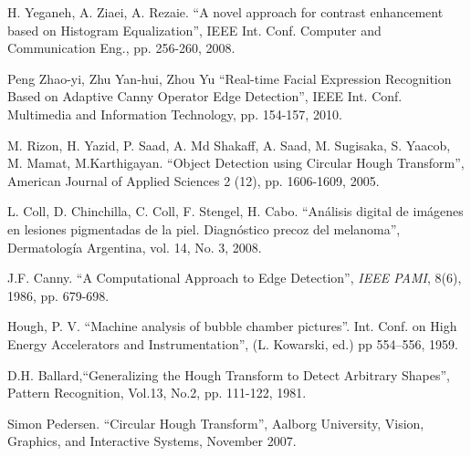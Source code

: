\documentclass[oribibl]{llncs}
\begin{document}


\begin{thebibliography}{20}

H. Yeganeh, A. Ziaei, A. Rezaie.
``A novel approach for contrast enhancement based on Histogram Equalization'',
IEEE Int. Conf. Computer and Communication Eng., pp. 256-260, 2008. 

Peng Zhao-yi, Zhu Yan-hui, Zhou Yu
``Real-time Facial Expression Recognition Based on Adaptive Canny Operator Edge Detection'',
IEEE Int. Conf. Multimedia and Information Technology, pp. 154-157, 2010. 

 M. Rizon, H. Yazid, P. Saad, A. Md Shakaff, A. Saad, M. Sugisaka, S. Yaacob, M. Mamat, M.Karthigayan.
``Object Detection using Circular Hough Transform'',
American Journal of Applied Sciences 2 (12), pp. 1606-1609, 2005.

  L. Coll, D. Chinchilla, C. Coll, F. Stengel, H. Cabo.
 ``Análisis digital de imágenes en lesiones pigmentadas de la piel. Diagnóstico precoz del melanoma'', Dermatología Argentina, vol. 14, No. 3, 2008.
 
 J.F. Canny.
``A Computational Approach to Edge Detection'', 
\emph{IEEE PAMI}, 8(6), 1986, pp. 679-698.

 Hough, P. V. 
``Machine analysis of bubble chamber pictures''. Int. Conf. on High Energy Accelerators and Instrumentation'', (L. Kowarski, ed.) pp 554--556, 1959.


 D.H. Ballard,``Generalizing the Hough Transform to Detect
Arbitrary Shapes'', Pattern Recognition, Vol.13, No.2, pp. 111-122, 1981.

 Simon Pedersen.
``Circular Hough Transform'',
Aalborg University, Vision, Graphics, and Interactive Systems, November 2007.

\end{thebibliography}
\end{document}

